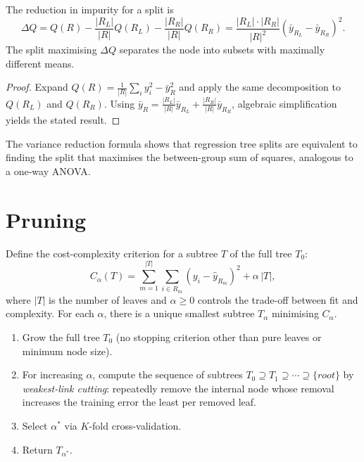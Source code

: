 \begin{theorem}
The reduction in impurity for a split is
\[
    \Delta Q = Q(R) - \frac{|R_L|}{|R|}Q(R_L) - \frac{|R_R|}{|R|}Q(R_R)
    = \frac{|R_L|\cdot|R_R|}{|R|^2}(\bar{y}_{R_L} - \bar{y}_{R_R})^2.
\]
The split maximising $\Delta Q$ separates the node into subsets with maximally different means.
\end{theorem}

\begin{proof}
Expand $Q(R) = \frac{1}{|R|}\sum_i y_i^2 - \bar{y}_R^2$ and apply the same decomposition to $Q(R_L)$ and $Q(R_R)$. Using $\bar{y}_R = \frac{|R_L|}{|R|}\bar{y}_{R_L} + \frac{|R_R|}{|R|}\bar{y}_{R_R}$, algebraic simplification yields the stated result.
\end{proof}

\begin{remark}
The variance reduction formula shows that regression tree splits are equivalent to finding the split that maximises the between-group sum of squares, analogous to a one-way ANOVA.
\end{remark}

\section{Pruning}

\begin{definition}
Define the cost-complexity criterion for a subtree $T$ of the full tree $T_0$:
\[
    C_\alpha(T) = \sum_{m=1}^{|T|}\sum_{i \in R_m}(y_i - \hat{y}_{R_m})^2 + \alpha\,|T|,
\]
where $|T|$ is the number of leaves and $\alpha \geq 0$ controls the trade-off between fit and complexity. For each $\alpha$, there is a unique smallest subtree $T_\alpha$ minimising $C_\alpha$.
\end{definition}

\begin{algorithme}[title=\textbf{Minimal Cost-Complexity Pruning}]
\begin{enumerate}
    \item Grow the full tree $T_0$ (no stopping criterion other than pure leaves or minimum node size).
    \item For increasing $\alpha$, compute the sequence of subtrees $T_0 \supseteq T_1 \supseteq \cdots \supseteq \{root\}$ by \emph{weakest-link cutting}: repeatedly remove the internal node whose removal increases the training error the least per removed leaf.
    \item Select $\alpha^*$ via $K$-fold cross-validation.
    \item Return $T_{\alpha^*}$.
\end{enumerate}
\end{algorithme}

